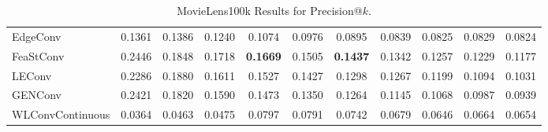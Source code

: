 \documentclass{scrartcl}
\begin{document}
\begin{appendices}
\begin{table}[htbp]
\begin{tabular}{|l|*{10}{c|}}
    \rowcolor[gray]{0.9} EdgeConv                 & 0.1361 & 0.1386 & 0.1240 & 0.1074 & 0.0976 & 0.0895 & 0.0839 & 0.0825 & 0.0829 & 0.0824 \\ 
    FeaStConv                & 0.2446 & 0.1848 & 0.1718 & \textbf{0.1669} & 0.1505 & \textbf{0.1437} & 0.1342 & 0.1257 & 0.1229 & 0.1177 \\ 
    \rowcolor[gray]{0.9} LEConv                   & 0.2286 & 0.1880 & 0.1611 & 0.1527 & 0.1427 & 0.1298 & 0.1267 & 0.1199 & 0.1094 & 0.1031 \\ 
    GENConv                  & 0.2421 & 0.1820 & 0.1590 & 0.1473 & 0.1350 & 0.1264 & 0.1145 & 0.1068 & 0.0987 & 0.0939 \\ 
    \rowcolor[gray]{0.9} WLConvContinuous         & 0.0364 & 0.0463 & 0.0475 & 0.0797 & 0.0791 & 0.0742 & 0.0679 & 0.0646 & 0.0664 & 0.0654 \\ \hline
    \end{tabular}
    \caption{MovieLens100k Results for Precision@$k$.}
    \label{tab:precision}
\end{table}


\end{appendices}
\end{document}
